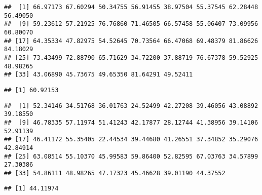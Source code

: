 \documentclass[
]{article}
\newenvironment{Shaded}{\begin{snugshade}}{\end{snugshade}}
\newcommand{\CommentTok}[1]{\textcolor[rgb]{0.56,0.35,0.01}{\textit{#1}}}
\newcommand{\FunctionTok}[1]{\textcolor[rgb]{0.13,0.29,0.53}{\textbf{#1}}}
\newcommand{\NormalTok}[1]{#1}
\newcommand{\SpecialCharTok}[1]{\textcolor[rgb]{0.81,0.36,0.00}{\textbf{#1}}}
\begin{document}
\begin{verbatim}
##  [1] 66.97173 67.60294 50.34755 56.91455 38.97504 55.37545 62.28448 56.49050
##  [9] 59.23612 57.21925 76.76860 71.46505 66.57458 55.06407 73.09956 60.80070
## [17] 64.35334 47.82975 54.52645 70.73564 66.47068 69.48379 81.86626 84.18029
## [25] 73.43499 72.88790 65.71629 34.72200 37.88719 76.67378 59.52925 48.98265
## [33] 43.06890 45.73675 49.65350 81.64291 49.52411
\end{verbatim}

\begin{Shaded}
\end{Shaded}

\begin{verbatim}
## [1] 60.92153
\end{verbatim}

\begin{Shaded}
\end{Shaded}

\begin{verbatim}
##  [1] 52.34146 34.51768 36.01763 24.52499 42.27208 39.46056 43.08892 39.18550
##  [9] 46.78335 57.11974 51.41243 42.17877 28.12744 41.38956 39.14106 52.91139
## [17] 46.41172 55.35405 22.44534 39.44680 41.26551 37.34852 35.29076 42.84914
## [25] 63.08514 55.10370 45.99583 59.86400 52.82595 67.03763 34.57899 27.30386
## [33] 54.86111 48.98265 47.17323 45.46628 39.01190 44.37552
\end{verbatim}

\begin{Shaded}
\end{Shaded}

\begin{verbatim}
## [1] 44.11974
\end{verbatim}
\end{document}
